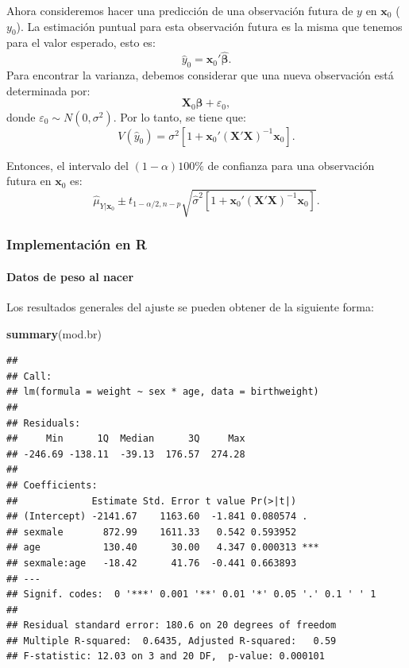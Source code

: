 \documentclass[
]{article}
\newenvironment{Shaded}{\begin{snugshade}}{\end{snugshade}}
\newcommand{\FunctionTok}[1]{\textcolor[rgb]{0.13,0.29,0.53}{\textbf{#1}}}
\newcommand{\NormalTok}[1]{#1}
\begin{document}
Ahora consideremos hacer una predicción de una observación futura de \(y\) en \(\boldsymbol x_0\) (\(y_0\)). La estimación puntual para esta observación futura es la misma que tenemos para el valor esperado, esto es:
\[
\widehat{y}_0 = \boldsymbol x_{0}'\widehat{\boldsymbol \beta}.
\]
Para encontrar la varianza, debemos considerar que una nueva observación está determinada por:
\[
\boldsymbol X_0\boldsymbol \beta+ \varepsilon_0,
\]
donde \(\varepsilon_0 \sim N(0,\sigma^2)\). Por lo tanto, se tiene que:
\[
V(\widehat{y}_0) = \sigma^{2}\left[ 1+ \boldsymbol x_{0}'(\boldsymbol X'\boldsymbol X)^{-1}\boldsymbol x_{0}\right].
\]

Entonces, el intervalo del \((1-\alpha)100\%\) de confianza para una observación futura en \(\boldsymbol x_{0}\) es:
\[
\widehat{\mu}_{Y|\boldsymbol x_0} \pm t_{1-\alpha/2,n-p}\sqrt{\widehat{\sigma}^2 \left[1+ \boldsymbol x_{0}'(\boldsymbol X'\boldsymbol X)^{-1}\boldsymbol x_{0}\right]}.
\]

\subsubsection{Implementación en R}\label{implementaciuxf3n-en-r}

\paragraph*{Datos de peso al nacer}\label{datos-de-peso-al-nacer-2}

Los resultados generales del ajuste se pueden obtener de la siguiente forma:

\begin{Shaded}
\begin{Highlighting}[]
\FunctionTok{summary}\NormalTok{(mod.br)}
\end{Highlighting}
\end{Shaded}

\begin{verbatim}
## 
## Call:
## lm(formula = weight ~ sex * age, data = birthweight)
## 
## Residuals:
##     Min      1Q  Median      3Q     Max 
## -246.69 -138.11  -39.13  176.57  274.28 
## 
## Coefficients:
##             Estimate Std. Error t value Pr(>|t|)    
## (Intercept) -2141.67    1163.60  -1.841 0.080574 .  
## sexmale       872.99    1611.33   0.542 0.593952    
## age           130.40      30.00   4.347 0.000313 ***
## sexmale:age   -18.42      41.76  -0.441 0.663893    
## ---
## Signif. codes:  0 '***' 0.001 '**' 0.01 '*' 0.05 '.' 0.1 ' ' 1
## 
## Residual standard error: 180.6 on 20 degrees of freedom
## Multiple R-squared:  0.6435, Adjusted R-squared:   0.59 
## F-statistic: 12.03 on 3 and 20 DF,  p-value: 0.000101
\end{verbatim}
\end{document}

